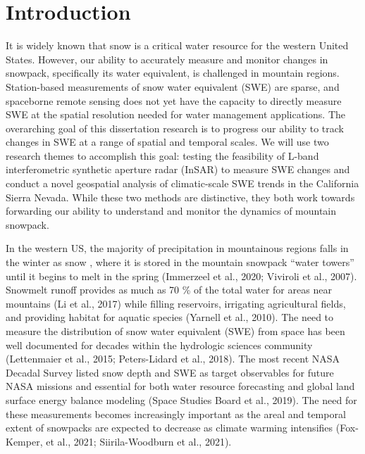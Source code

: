 
\hypertarget{ch1}{%
\chapter{Introduction}\label{ch1}}


It is widely known that snow is a critical water resource for the western United States. However, our ability to accurately measure and monitor changes in snowpack, specifically its water equivalent, is challenged in mountain regions. Station-based measurements of snow water equivalent (SWE) are sparse, and spaceborne remote sensing does not yet have the capacity to directly measure SWE at the spatial resolution needed for water management applications. The overarching goal of this dissertation research is to progress our ability to track changes in SWE at a range of spatial and temporal scales. We will use two research themes to accomplish this goal: testing the feasibility of L-band interferometric synthetic aperture radar (InSAR) to measure SWE changes and conduct a novel geospatial analysis of climatic-scale SWE trends in the California Sierra Nevada. While these two methods are distinctive, they both work towards forwarding our ability to understand and monitor the dynamics of mountain snowpack. \par

In the western US, the majority of precipitation in mountainous regions falls in the winter as snow \citep{serrezeCharacteristicsLargeSnowfall2001}, where it is stored in the mountain snowpack “water towers” until it begins to melt in the spring (Immerzeel et al., 2020; Viviroli et al., 2007). Snowmelt runoff provides as much as 70 \% of the total water for areas near mountains (Li et al., 2017) while filling reservoirs, irrigating agricultural fields, and providing habitat for aquatic species (Yarnell et al., 2010).
The need to measure the distribution of snow water equivalent (SWE) from space has been well documented for decades within the hydrologic sciences community (Lettenmaier et al., 2015; Peters-Lidard et al., 2018). The most recent NASA Decadal Survey listed snow depth and SWE as target observables for future NASA missions and essential for both water resource forecasting and global land surface energy balance modeling (Space Studies Board et al., 2019). The need for these measurements becomes increasingly important as the areal and temporal extent of snowpacks are expected to decrease as climate warming intensifies (Fox-Kemper, et al., 2021; Siirila-Woodburn et al., 2021). \par

